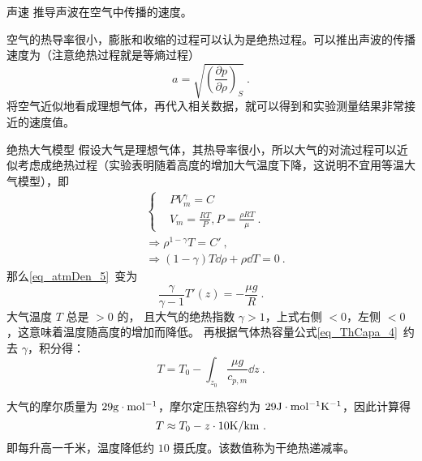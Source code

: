 \begin{example}{声速}
推导声波在空气中传播的速度。

空气的热导率很小，膨胀和收缩的过程可以认为是绝热过程。可以推出声波的传播速度为（注意绝热过程就是等熵过程）
\begin{equation}
a=\sqrt{\left(\frac{\partial p}{\partial \rho}\right)_S}~.
\end{equation}
将空气近似地看成理想气体，再代入相关数据，就可以得到和实验测量结果非常接近的速度值。
\end{example}
\begin{example}{绝热大气模型}
假设大气是理想气体，其热导率很小，所以大气的对流过程可以近似考虑成绝热过程（实验表明随着高度的增加大气温度下降，这说明不宜用等温大气模型），即
\begin{equation}
\begin{aligned}
&\begin{cases}
&PV_m^\gamma=C\\
&V_m=\frac{RT}{P},P=\frac{\rho R T}{\mu}~.
\end{cases}
\\
&\Rightarrow \rho^{1-\gamma}T=C'~,\\
&\Rightarrow (1-\gamma)T\dd \rho+\rho\dd T=0~.
\end{aligned}
\end{equation}
那么\autoref{eq_atmDen_5}~变为
\begin{equation}
\frac{\gamma}{\gamma-1}T'(z)=-\frac{\mu g}{R}~.
\end{equation}
大气温度 $T$ 总是 $>0$ 的， 且大气的绝热指数 $\gamma>1$，上式右侧 $<0$，左侧 $<0$，这意味着温度随高度的增加而降低。 再根据气体热容量公式\autoref{eq_ThCapa_4}~约去 $\gamma$，积分得：
\begin{equation}\label{eq_Adiab_6}
T=T_0-\int_{z_0}\frac{\mu g}{c_{p,m}} \dd z ~.
\end{equation}


大气的摩尔质量为 $29 \rm{g\cdot mol^{-1}}$，摩尔定压热容约为 $29 \rm{J\cdot mol^{-1}K^{-1}}$，因此计算得
\begin{equation}
T\approx T_0-z\cdot 10 \rm{K/km}~.
\end{equation}
即每升高一千米，温度降低约 $10$ 摄氏度。该数值称为干绝热递减率。
\end{example}
